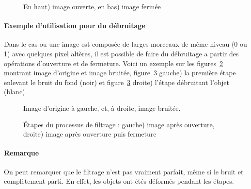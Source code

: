 \documentclass[10pt,a4paper]{article}
\begin{document}
\begin{figure}[h]
\hspace{-0.2\textwidth}
\caption{En haut) image ouverte, en bas) image ferm\'{e}e}
\label{pieceOF}
\end{figure}


\clearpage

\paragraph{Exemple d'utilisation pour du d\'{e}bruitage} Dans le cas ou une image est compos\'{e}e de larges morceaux de m\^{e}me niveau (0 ou 1) avec quelques pixel alt\`{e}res, il est possible de faire du d\'{e}bruitage a partir des op\'{e}rations d'ouverture et de fermeture. Voici un exemple sur les figures~\ref{debruitageOrigine} montrant image d'origine et image bruit\'{e}e, figure~\ref{debruitageSteps} gauche)  la premi\`{e}re \'{e}tape enlevant le bruit du fond (noir) et figure~\ref{debruitageSteps} droite) l'\'{e}tape d\'{e}bruitant l'objet (blanc).

\begin{figure}[h]
\hspace{-0.2\textwidth}
\vspace{-40mm}
	\caption{Image d'origine \`{a} gauche, et, \`{a} droite, image bruit\'{e}e.}
	\label{debruitageOrigine}
\end{figure}

\begin{figure}[h]
\hspace{-0.2\textwidth}
\vspace{-40mm}
	\caption{\'{E}tapes du processus de filtrage : gauche) image apr\`{e}s ouverture, droite) image apr\`{e}s ouverture puis fermeture}
	\label{debruitageSteps}
\end{figure}

\paragraph{Remarque} On peut remarquer que le filtrage n'est pas vraiment parfait, m\^{e}me si le bruit et compl\`{e}tement parti. En effet, les objets ont \'{e}t\'{e}s déform\'{e}s pendant les \'{e}tapes.

\clearpage
\end{document}
